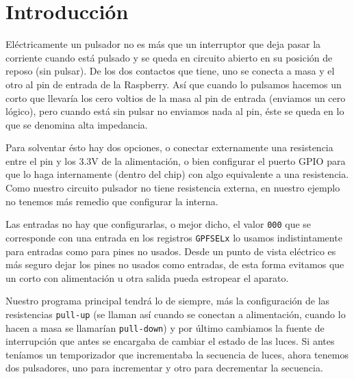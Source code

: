 
\pagestyle{fancy}
\fancyhead[LE,RO]{\thepage}
\fancyhead[LO]{\nouppercase{\rightmark}}

\label{chp:SerieBoot}
\minitoc

\section{Introducción}

Eléctricamente un pulsador no es más que un interruptor que deja pasar
la corriente cuando está pulsado y se queda en circuito abierto en su posición de reposo
(sin pulsar). De los dos contactos que tiene, uno se conecta a masa y el otro al pin de
entrada de la Raspberry. Así que cuando lo pulsamos hacemos un corto que llevaría los cero
voltios de la masa al pin de entrada (enviamos un cero lógico), pero cuando está sin pulsar
no enviamos nada al pin, éste se queda en lo que se denomina alta impedancia.

Para solventar ésto hay dos opciones, o conectar externamente una resistencia entre el pin y
los 3.3V de la alimentación, o bien configurar el puerto GPIO para que lo haga internamente
(dentro del chip) con algo equivalente a una resistencia. Como nuestro circuito pulsador no
tiene resistencia externa, en nuestro ejemplo no tenemos más remedio que configurar la interna.

Las entradas no hay que configurarlas, o mejor dicho, el valor {\tt 000} que se corresponde
con una entrada en los registros {\tt GPFSELx} lo usamos indistintamente para entradas como
para pines no usados. Desde un punto de vista eléctrico es más seguro dejar los pines no usados
como entradas, de esta forma evitamos que un corto con alimentación u otra salida pueda estropear
el aparato.

Nuestro programa principal tendrá lo de siempre, más la configuración de las resistencias
{\tt pull-up} (se llaman así cuando se conectan a alimentación, cuando lo hacen a masa se
llamarían {\tt pull-down}) y por último cambiamos la fuente de interrupción que antes se
encargaba de cambiar el estado de las luces. Si antes teníamos un temporizador que
incrementaba la secuencia de luces, ahora tenemos dos pulsadores, uno para incrementar y
otro para decrementar la secuencia.

